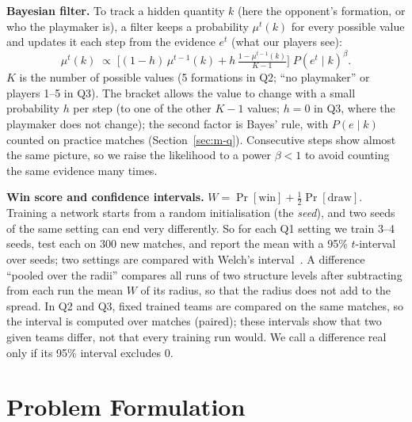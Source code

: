 \documentclass{article}
\begin{document}
\textbf{Bayesian filter.} To track a hidden quantity $k$ (here the opponent's formation, or who the playmaker is), a
filter keeps a probability $\mu^t(k)$ for every possible value and updates it each step from the evidence $e^t$ (what
our players see):
\begin{equation}
\mu^t(k)\;\propto\;\Big[(1-h)\,\mu^{t-1}(k)+h\,\tfrac{1-\mu^{t-1}(k)}{K-1}\Big]\;P(e^t\mid k)^{\beta}.
\label{eq:filter}
\end{equation}
$K$ is the number of possible values (5 formations in Q2; ``no playmaker'' or players 1--5 in Q3). The bracket allows
the value to change with a small probability $h$ per step (to one of the other $K-1$ values; $h=0$ in Q3, where the
playmaker does not change); the second factor is Bayes' rule, with $P(e\mid k)$ counted on practice matches
(Section~\ref{sec:m-q}). Consecutive steps show almost the same picture, so we raise the likelihood to a power
$\beta<1$ to avoid counting the same evidence many times.

\textbf{Win score and confidence intervals.} $W=\Pr[\text{win}]+\tfrac12\Pr[\text{draw}]$. Training a network starts
from a random initialisation (the \emph{seed}), and two seeds of the same setting can end very differently. So for
each Q1 setting we train 3--4 seeds, test each on 300 new matches, and report the mean with a 95\% $t$-interval over
seeds; two settings are compared with Welch's interval~\cite{welch1947}. A difference ``pooled over the radii'' compares all
runs of two structure levels after subtracting from each run the mean $W$ of its radius, so that the radius does not
add to the spread. In Q2 and Q3, fixed trained teams are compared on the same matches, so the interval is computed over matches
(paired); these intervals show that two given teams differ, not that every training run would. We call a difference real only if its 95\% interval excludes
0.

\section{Problem Formulation}
\label{sec:problem}
\end{document}
